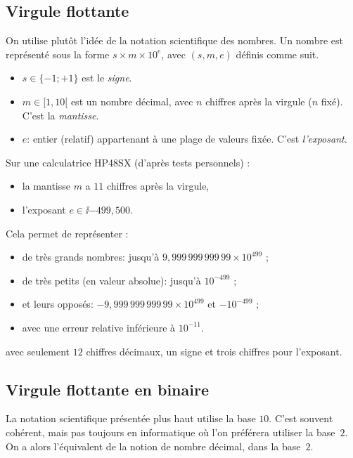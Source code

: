 \subsection{Virgule flottante}
On utilise plutôt l'idée de la notation scientifique des nombres. Un nombre est représenté sous la forme $s\times m \times 10^{e}$, avec $(s,m,e)$ définis comme suit. 
\begin{itemize} 
\item[\textbullet] $s\in\{-1;+1\}$ est le \emph{signe}.
\item[\textbullet] $m\in [1,10[$ est un nombre décimal, avec $n$ chiffres après la virgule ($n$ fixé). C'est la \emph{mantisse}.
\item[\textbullet] $e$: entier (relatif) appartenant à une plage de valeurs fixée. C'est \emph{l'exposant}.
\end{itemize}
\begin{exemple}
  Sur une  calculatrice HP48SX (d'après tests personnels) :
\begin{itemize}
\item[\textbullet] la mantisse $m$ a $11$ chiffres après la virgule,
\item[\textbullet] l'exposant $e\in \ii{-499,500}$.
\end{itemize}
Cela permet de représenter :
\begin{itemize}
\item[\textbullet] de très grands nombres: jusqu'à $9,999\,999\,999\,99\times 10^{499}$ ;
\item[\textbullet] de très petits (en valeur absolue): jusqu'à $10^{-499}$ ;
\item[\textbullet] et leurs opposés: $-9,999\,999\,999\,99\times 10^{499}$ et $-10^{-499}$ ;
\item[\textbullet] avec une erreur relative inférieure à $10^{-11}$.
\end{itemize}
avec seulement $12$ chiffres décimaux, un signe et trois chiffres pour
l'exposant. 
\end{exemple}
 
\subsection{Virgule flottante en binaire}

La notation scientifique présentée plus haut utilise la base $10$. 
C'est souvent cohérent, mais pas toujours en informatique où l'on préférera utiliser la base~$2$.
On a alors l'équivalent de la notion de nombre décimal, dans la base~$2$.

